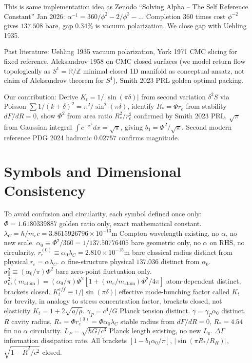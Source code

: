\documentclass[11pt,a4paper]{article}
\begin{document}
This is same implementation idea as Zenodo ``Solving Alpha -- The Self Reference Constant'' Jan 2026: $\alpha^{-1}=360/\phi^2-2/\phi^3-...$ Completion $360$ times cost $\phi^{-2}$ gives $137.508$ bare, gap $0.34\%$ is vacuum polarization. We close gap with Uehling 1935.

Past literature: Uehling 1935 vacuum polarization, York 1971 CMC slicing for fixed reference, Aleksandrov 1958 on CMC closed surfaces (we model return flow topologically as $S^1=\mathbb{R}/\mathbb{Z}$ minimal closed 1D manifold as conceptual ansatz, not claim of Aleksandrov theorem for $S^1$), Smith 2023 PRL golden optimal packing.

Our contribution: Derive $K_t=1/|\sin(\pi\delta)|$ from second variation $\delta^2S$ via Poisson $\sum1/(k+\delta)^2=\pi^2/\sin^2(\pi\delta)$, identify $R_*=\Phi r_e$ from stability $dF/dR=0$, show $\Phi^2$ from area ratio $R_*^2/r_e^2$ confirmed by Smith 2023 PRL, $\sqrt{\pi}$ from Gaussian integral $\int e^{-x^2}dx=\sqrt{\pi}$, giving $b_1=\Phi^2/\sqrt{\pi}$. Second modern reference PDG 2024 hadronic $0.02757$ confirms magnitude.

\section{Symbols and Dimensional Consistency}
To avoid confusion and circularity, each symbol defined once only:
$\Phi=1.6180339887$ golden ratio only, exact mathematical constant.
$\lambda_C=\hbar/m_ec=3.8615926796\times10^{-13}$m Compton wavelength existing, no $\alpha$, no new scale.
$\alpha_0\equiv\Phi^2/360=1/137.50776405$ bare geometric only, no $\alpha$ on RHS, no circularity.
$r_e^{(0)}\equiv\alpha_0\lambda_C=2.810\times10^{-15}$m bare classical radius distinct from physical $r_e=\alpha\lambda_C$.
$\alpha$ fine-structure physical $137.036$ distinct from $\alpha_0$.
$\sigma_0^2\equiv(\alpha_0/\pi)\Phi^2$ bare zero-point fluctuation only.
$\sigma_m^2(m_{\text{atom}})=(\alpha_0/\pi)\Phi^2[1+(m_e/m_{\text{atom}})\Phi^2/4\pi]$ atom-dependent distinct, brackets closed.
$K_t^{eff}\equiv1/|\sin(\pi\delta)|$ effective mode-bunching factor called $K_t$ for brevity, in analogy to stress concentration factor, brackets closed, not elasticity $K_t=1+2\sqrt{a/\rho}$.
$\gamma_P=c^4/G$ Planck tension distinct.
$\gamma=\gamma_P\alpha_0$ distinct.
$R$ cavity radius, $R_*=\Phi r_e^{(0)}=\Phi\alpha_0\lambda_C$ stable radius from $dF/dR=0$, $R_*=4.54$fm no $\alpha$ circularity.
$L_P=\sqrt{\hbar G/c^3}$ Planck length existing, no new $L_0$.
$\Delta\Gamma$ information dissipation rate.
All brackets $\left[1-b_1\alpha_0/\pi\right]$, $\left|\sin(\pi R_*/R_H)\right|$, $\sqrt{1-\dot R^2/c^2}$ closed.
\end{document}

